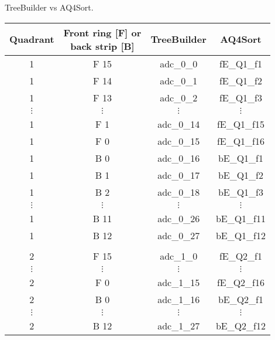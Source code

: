 \caption{TreeBuilder vs AQ4Sort.}
\label{tab:TBvsAQ4}
\begin{tabular}{cccc}
\hline
Quadrant  &  \shortstack{Front ring [F] or \\ back strip [B]}  &  TreeBuilder  &  AQ4Sort      \\
\hline
1         &  F 15             				   				   &  adc\_0\_0    &  fE\_Q1\_f1   \\
1         &  F 14             				   				   &  adc\_0\_1    &  fE\_Q1\_f2   \\
1         &  F 13             				   				   &  adc\_0\_2    &  fE\_Q1\_f3   \\
$\vdots$  &  $\vdots$                  		   				   &  $\vdots$     &  $\vdots$     \\
1         &  F 1              				   				   &  adc\_0\_14   &  fE\_Q1\_f15  \\
1         &  F 0              				   				   &  adc\_0\_15   &  fE\_Q1\_f16  \\
1         &  B 0              				   				   &  adc\_0\_16   &  bE\_Q1\_f1   \\
1         &  B 1              				   				   &  adc\_0\_17   &  bE\_Q1\_f2   \\
1         &  B 2              				   				   &  adc\_0\_18   &  bE\_Q1\_f3   \\
$\vdots$  &  $\vdots$                  		   				   &  $\vdots$     &  $\vdots$     \\
1         &  B 11             				   				   &  adc\_0\_26   &  bE\_Q1\_f11  \\
1         &  B 12             				   				   &  adc\_0\_27   &  bE\_Q1\_f12  \\
          &                            		   				   &               &               \\
2         &  F 15             				   				   &  adc\_1\_0    &  fE\_Q2\_f1   \\
$\vdots$  &  $\vdots$                  		   				   &  $\vdots$     &  $\vdots$     \\
2         &  F 0              				   				   &  adc\_1\_15   &  fE\_Q2\_f16  \\
2         &  B 0              				   				   &  adc\_1\_16   &  bE\_Q2\_f1   \\
$\vdots$  &  $\vdots$                  		   				   &  $\vdots$     &  $\vdots$     \\
2         &  B 12             				   				   &  adc\_1\_27   &  bE\_Q2\_f12  \\

\end{tabular}
